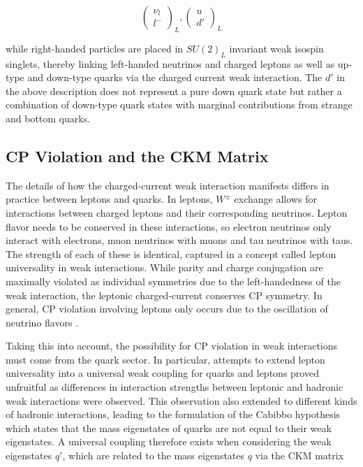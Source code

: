 \begin{equation}
\begin{pmatrix} \nu_{l} \\ l^- \end{pmatrix}_L, 
\begin{pmatrix} u \\ d' \end{pmatrix}_L
\end{equation}

while right-handed particles are placed in $SU(2)_L$ invariant weak isospin singlets, thereby linking left-handed 
neutrinos and charged leptons as well as up-type and down-type quarks via the charged current weak interaction.  
The $d'$ in the above description does not represent a pure down quark state but rather a combination of down-type 
quark states with marginal contributions from strange and bottom quarks.

\subsection{CP Violation and the CKM Matrix}

The details of how the charged-current weak interaction manifests differs in practice between leptons and quarks. In 
leptons, $W^{\pm}$ exchange allows for interactions between charged leptons and their corresponding neutrinos. 
Lepton flavor needs to be conserved in these interactions, so electron neutrinos only interact with electrons, muon 
neutrinos with muons and tau neutrinos with taus. The strength of each of these is identical, captured in a concept 
called lepton universality in weak interactions. While parity and charge conjugation are maximally violated as 
individual symmetries due to the left-handedness of the weak interaction, the leptonic charged-current conserves 
CP symmetry. In general, CP violation involving leptons only occurs due to the oscillation of neutrino flavors 
\cite{bellini-neutrino-oscillations}. \par

Taking this into account, the possibility for CP violation in weak interactions must come from the quark sector. 
In particular, attempts to extend lepton universality into a universal weak coupling for quarks and leptons proved 
unfruitful as differences in interaction strengths between leptonic and hadronic weak interactions were observed. 
This observation also extended to different kinds of hadronic interactions, leading to the formulation of the Cabibbo 
hypothesis which states that the mass eigenstates of quarks are not equal to their weak eigenstates. A universal 
coupling therefore exists when considering the weak eigenstates $q'$, which are related to the mass eigenstates $q$ 
via the CKM matrix \cite{cabibbo-ckm-matrix, kobayashi-ckm-matrix}

